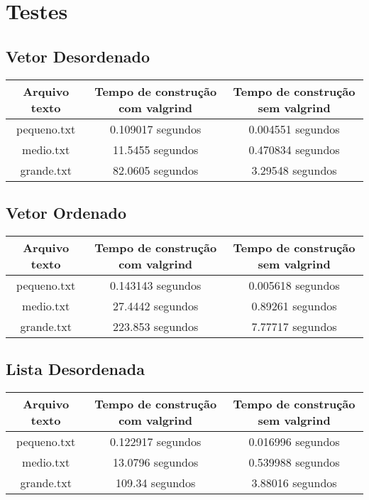 \documentclass{article}
\begin{document}
\section{Testes}

\subsection{Vetor Desordenado}

\label{SampleTable}
\begin{tabular}[t]{|c|c|c|}
\hline
\textbf{Arquivo texto} & \textbf{Tempo de construção com valgrind} & \textbf{Tempo de construção sem valgrind} \\
\hline\hline
pequeno.txt & 0.109017 segundos & 0.004551 segundos \\
\hline
medio.txt & 11.5455 segundos & 0.470834 segundos \\
\hline
grande.txt & 82.0605 segundos & 3.29548 segundos\\
\hline
\end{tabular}

\subsection{Vetor Ordenado}

\label{SampleTable}
\begin{tabular}[t]{|c|c|c|}
\hline
\textbf{Arquivo texto} & \textbf{Tempo de construção com valgrind} & \textbf{Tempo de construção sem valgrind} \\
\hline\hline
pequeno.txt & 0.143143 segundos & 0.005618 segundos \\
\hline
medio.txt & 27.4442 segundos & 0.89261 segundos \\
\hline
grande.txt & 223.853 segundos & 7.77717 segundos\\
\hline
\end{tabular}

\subsection{Lista Desordenada}

\label{SampleTable}
\begin{tabular}[t]{|c|c|c|}
\hline
\textbf{Arquivo texto} & \textbf{Tempo de construção com valgrind} & \textbf{Tempo de construção sem valgrind} \\
\hline\hline
pequeno.txt & 0.122917 segundos & 0.016996 segundos \\
\hline
medio.txt & 13.0796 segundos & 0.539988 segundos \\
\hline
grande.txt & 109.34 segundos & 3.88016 segundos \\
\hline
\end{tabular}
\end{document}
